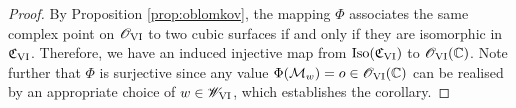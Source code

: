 \documentclass[a4paper,reqno]{amsart}
\numberwithin{equation}{section}
\newcommand{\C}{\mathbb{C}}
\newcommand{\p}{\mathbb{P}}
\numberwithin{equation}{section}
\begin{document}
\begin{proof}





By Proposition \ref{prop:oblomkov}, the mapping $\Phi$ associates the same complex point on $\mathscr{O}_{\rm{VI}}$ to two cubic surfaces if and only if they are isomorphic in $\mathfrak{C}_{\rm{VI}}$. 
Therefore, we have an induced injective map from $\operatorname{Iso}(\mathfrak{C}_{\rm{VI}})$ to  $\mathscr{O}_{\rm{VI}}(\C)$.
Note further that $\Phi$ is  surjective since any value $\Phi(\mathcal{M}_w)=o\in \mathscr{O}_{\rm{VI}}(\C)$ can be realised by an appropriate choice of $w\in \mathscr{W}_{\rm{VI}}$, which establishes the corollary.
\end{proof}
\end{document}
